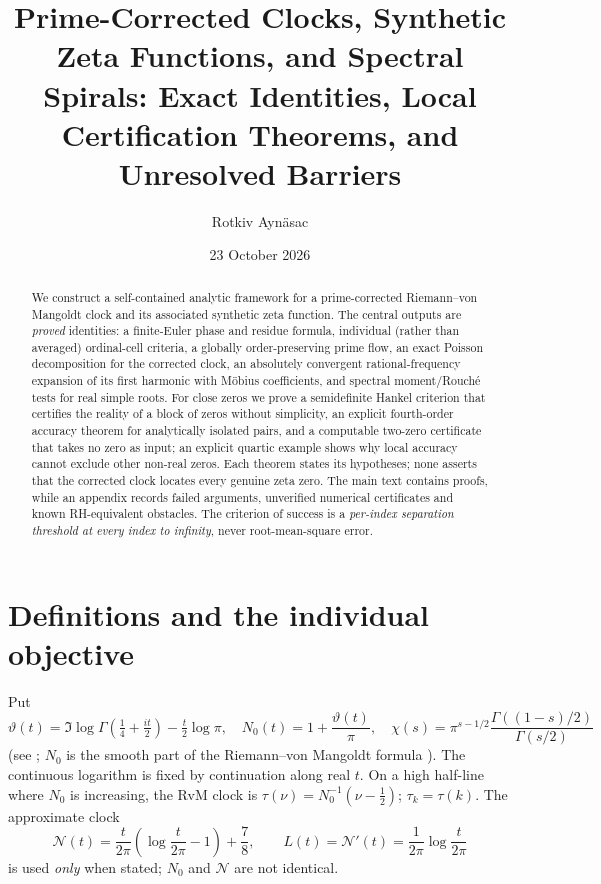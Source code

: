 \documentclass[11pt,reqno]{amsart}
\makeatletter
\let\CG@origcite\cite
\renewcommand*{\cite}[2][]{\def\CG@citekey{#2}%
  \ifx\relax#1\relax\CG@origcite{#2}\else\CG@origcite[#1]{#2}\fi}
\numberwithin{equation}{section}
\theoremstyle{plain}
\theoremstyle{definition}
\theoremstyle{remark}
\makeatother
\begin{document}
\title[Prime-corrected clocks and spectral spirals]{Prime-Corrected Clocks, Synthetic Zeta Functions, and Spectral Spirals: Exact Identities, Local Certification Theorems, and Unresolved Barriers}
\author{Rotkiv Ayn\"asac}
\date{23 October 2026}

\begin{abstract}
We construct a self-contained analytic framework for a prime-corrected Riemann--von Mangoldt clock and its associated synthetic zeta function. The central outputs are \emph{proved} identities: a finite-Euler phase and residue formula, individual (rather than averaged) ordinal-cell criteria, a globally order-preserving prime flow, an exact Poisson decomposition for the corrected clock, an absolutely convergent rational-frequency expansion of its first harmonic with M\"obius coefficients, and spectral moment/Rouch\'e tests for real simple roots. For close zeros we prove a semidefinite Hankel criterion that certifies the reality of a block of zeros without simplicity, an explicit fourth-order accuracy theorem for analytically isolated pairs, and a computable two-zero certificate that takes no zero as input; an explicit quartic example shows why local accuracy cannot exclude other non-real zeros. Each theorem states its hypotheses; none asserts that the corrected clock locates every genuine zeta zero. The main text contains proofs, while an appendix records failed arguments, unverified numerical certificates and known RH-equivalent obstacles. The criterion of success is a \emph{per-index separation threshold at every index to infinity}, never root-mean-square error.
\end{abstract}

\maketitle
\tableofcontents

\section{Definitions and the individual objective}\label{sec:defs}
Put
\begin{equation}\label{eq:theta}
\vartheta(t)=\Im\log\Gamma\!\left(\tfrac14+\tfrac{it}{2}\right)-\tfrac t2\log\pi,
\quad N_0(t)=1+\frac{\vartheta(t)}\pi,
\quad\chi(s)=\pi^{s-1/2}\frac{\Gamma((1-s)/2)}{\Gamma(s/2)}
\end{equation}
(see \cite{Titchmarsh1986,Edwards1974}; $N_0$ is the smooth part of the Riemann--von Mangoldt formula \cite{Mangoldt1905}). The continuous logarithm is fixed by continuation along real $t$. On a high half-line where $N_0$ is increasing, the RvM clock is $\tau(\nu)=N_0^{-1}(\nu-\tfrac12)$; $\tau_k=\tau(k)$. The approximate clock
\begin{equation}\label{eq:lead-clock}
\mathcal N(t)=\frac{t}{2\pi}\left(\log\frac{t}{2\pi}-1\right)+\frac78,
\qquad L(t)=\mathcal N'(t)=\frac1{2\pi}\log\frac{t}{2\pi}
\end{equation}
is used \emph{only} when stated; $N_0$ and $\mathcal N$ are not identical.
\end{document}
